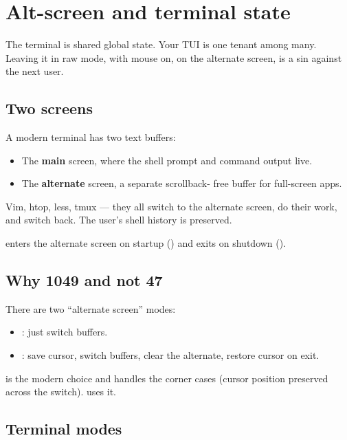 \chapter{Alt-screen and terminal state}
\label{ch:altscreen}

\begin{aside}
The terminal is shared global state. Your TUI is one tenant
among many. Leaving it in raw mode, with mouse on, on the
alternate screen, is a sin against the next user.
\end{aside}

\section{Two screens}

A modern terminal has two text buffers:

\begin{itemize}[leftmargin=*]
  \item The \textbf{main} screen, where the shell prompt and
    command output live.
  \item The \textbf{alternate} screen, a separate scrollback-
    free buffer for full-screen apps.
\end{itemize}

Vim, htop, less, tmux --- they all switch to the alternate
screen, do their work, and switch back. The user's shell
history is preserved.

\maya{} enters the alternate screen on startup
(\code{ESC [ ? 1049 h}) and exits on shutdown
(\code{ESC [ ? 1049 l}).

\section{Why 1049 and not 47}

There are two ``alternate screen'' modes:

\begin{itemize}[leftmargin=*]
  \item {}: just switch buffers.
  \item {}: save cursor, switch buffers, clear the
    alternate, restore cursor on exit.
\end{itemize}

 is the modern choice and handles the corner cases
(cursor position preserved across the switch). \maya{} uses it.

\section{Terminal modes}

